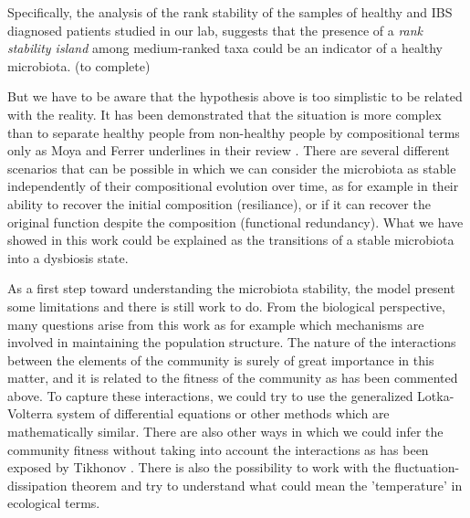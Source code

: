 Specifically, the analysis of the rank stability of the samples of healthy and IBS diagnosed patients studied in our lab\cite{IBS}, suggests that the presence of a \emph{rank stability island} among medium-ranked taxa could be an indicator of a healthy microbiota. (to complete)

But we have to be aware that the hypothesis above is too simplistic to be related with the reality. It has been demonstrated that the situation is more complex than to separate healthy people from non-healthy people by compositional terms only as Moya and Ferrer underlines in their review \cite{Moya_trends}. There are several different scenarios that can be possible in which we can consider the microbiota as stable independently of their compositional evolution over time, as for example in their ability to recover the initial composition (resiliance), or if it can recover the original function despite the composition (functional redundancy). What we have showed in this work could be explained as the transitions of a stable microbiota into a dysbiosis state.  

As a first step toward understanding the microbiota stability, the model present some limitations and there is still work to do. From the biological perspective, many questions arise from this work as for example which mechanisms are involved in maintaining the population structure. The nature of the interactions between the elements of the community is surely of great importance in this matter, and it is related to the fitness of the community as has been commented above. To capture these interactions, we could try to use the generalized Lotka-Volterra system of differential equations or other methods which are mathematically similar. There are also other ways in which we could infer the community fitness without taking into account the interactions as has been exposed by Tikhonov \cite{tikhonov}. There is also the possibility to work with the fluctuation-dissipation theorem and try to understand what could mean the 'temperature' in ecological terms.